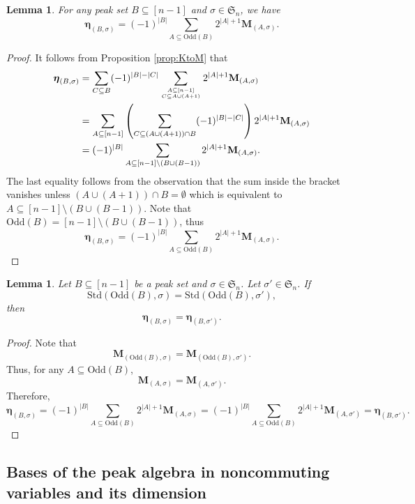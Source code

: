 \documentclass[11pt]{amsart}
\newtheorem{Lemma}[Theorem]{Lemma}
\numberwithin{equation}{section}
\newcommand{\SetComp}{\mathrm{SetComp}}
\newcommand{\odd}{\mathrm{Odd}}
\newcommand{\std}{\mathrm{Std}}
\newcommand{\bfM}{{\mathbf{M}}}
\newcommand{\boldeta}{{\boldsymbol{\eta}}}
\begin{document}
\begin{Lemma}\label{lem:N}
	For any peak set $B\subseteq[n-1]$ and $\sigma\in\mathfrak{S}_n$, we have
	$$\boldeta_{(B,\sigma)}=(-1)^{|B|}\sum_{A\subseteq \odd(B)}2^{|A|+1}\mathbf{M}_{(A,\sigma)}.$$
\end{Lemma}



\begin{proof}
	It follows from Proposition \ref{prop:KtoM} that
	\begin{align*}
		\boldeta_{(B,\sigma)}&=\sum_{C\subseteq B}(-1)^{|B|-|C|}\sum_{A\subseteq[n-1] \atop C\subseteq A\cup(A+1)}2^{|A|+1}\mathbf{M}_{(A,\sigma)}\\
		&=\sum_{A\subseteq[n-1]}\left(\sum_{C\subseteq (A\cup(A+1))\cap B}(-1)^{|B|-|C|}\right)2^{|A|+1}\mathbf{M}_{(A,\sigma)}\\
		&=(-1)^{|B|}\sum_{A\subseteq [n-1]\setminus(B\cup (B-1))}2^{|A|+1}\mathbf{M}_{(A,\sigma)}.
	\end{align*}
	The last equality follows from the observation that the sum inside the bracket vanishes unless $(A\cup(A+1))\cap B=\emptyset$ which is equivalent to $A\subseteq[n-1]\setminus(B\cup(B-1))$. Note that $\odd(B)=[n-1]\setminus (B\cup (B-1))$, thus 
	$$\boldeta_{(B,\sigma)}=(-1)^{|B|}\sum_{A\subseteq \odd(B)}2^{|A|+1}\mathbf{M}_{(A,\sigma)}.$$
\end{proof}

\begin{Lemma}\label{lem:eq-eta}
Let $B\subseteq[n-1]$ be a peak set and $\sigma\in \mathfrak{S}_n$. Let $\sigma'\in \mathfrak{S}_n$. If   
$$\std(\odd(B),\sigma)=\std(\odd(B),\sigma'),$$
 then 
$$\boldeta_{(B,\sigma)}=\boldeta_{(B,\sigma')}.$$
\end{Lemma}

\begin{proof}
Note that $$\bfM_{(\odd(B),\sigma)}=\bfM_{(\odd(B),\sigma')}.$$ Thus, for any $A\subseteq \odd(B)$, 
$$\bfM_{(A,\sigma)}=\bfM_{(A,\sigma')}.$$
Therefore,
$$\boldeta_{(B,\sigma)}=(-1)^{|B|}\sum_{A\subseteq \odd(B)}2^{|A|+1}\mathbf{M}_{(A,\sigma)}=(-1)^{|B|}\sum_{A\subseteq \odd(B)}2^{|A|+1}\mathbf{M}_{(A,\sigma')}=\boldeta_{(B,\sigma')}.$$

\end{proof} 

\subsection{Bases of the peak algebra in noncommuting variables and its dimension}\label{subsec:bases-peak}
\end{document}
